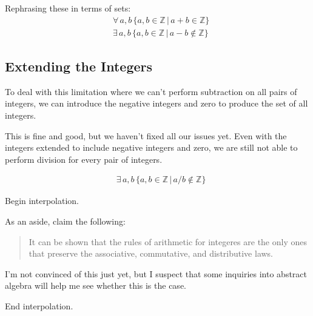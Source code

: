 \documentclass[leqno]{article}
\begin{document}
Rephrasing these in terms of sets:
\begin{align}
    &\forall \, a, b \, \{a, b \in \mathbb{Z} \,|\, a+b \in \mathbb{Z}\}\\
    &\exists \, a, b \, \{a, b \in \mathbb{Z} \,|\, a-b \not\in \mathbb{Z}\}
\end{align}

\subsection{Extending the Integers}

To deal with this limitation
where we can't perform subtraction on all pairs of integers,
we can introduce the negative integers and zero
to produce the set of all integers.

This is fine and good, but we haven't fixed all our issues yet.
Even with the integers extended to include negative integers and zero,
we are still not able to perform division for every pair of integers.

\begin{align}
    &\exists \, a, b \, \{a, b \in \mathbb{Z} \,|\, a/b \not\in \mathbb{Z}\}
\end{align}

Begin interpolation.

As an aside, \textcite{fisherIntegratedAlgebraTrigonometry1962} claim the following:
\begin{quote}
    It can be shown that the rules of arithmetic
    for integeres are the only ones that preserve
    the associative, commutative, and distributive
    laws.
\end{quote}

I'm not convinced of this just yet, but I suspect that some inquiries into abstract algebra will help me see whether this is the case.

End interpolation.

\newpage
\printbibliography
\end{document}
